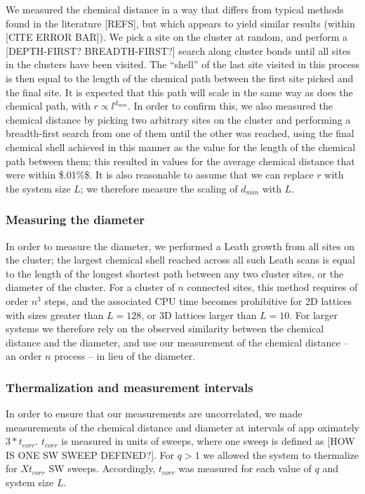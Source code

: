 \documentclass{article}
\begin{document}
We measured the chemical distance in a way that differs from typical methods found in the literature [REFS], but which appears to yield similar results (within [CITE ERROR BAR]).  We pick a site on the cluster at random, and perform a [DEPTH-FIRST? BREADTH-FIRST?] search along cluster bonds until all sites in the clusters have been visited.  The ``shell'' of the last site visited in this process is then equal to the length of the chemical path between the first site picked and the final site.  It is expected that this path will scale in the same way as does the chemical path, with $r \propto l^{d_{min}}$. In order to confirm this, we also measured the chemical distance by picking two arbitrary sites on the cluster and performing a breadth-first search from one of them until the other was reached, using the final chemical shell achieved in this manner as the value for the length of the chemical path between them; this resulted in values for the average chemical distance that were within \$.01\%\$. It is also reasonable to assume that we can replace $r$ with the system size $L$; we therefore measure the scaling of $d_{min}$ with $L$. 
\subsubsection{Measuring the diameter}
\label{sec-2.1.5}

In order to measure the diameter, we performed a Leath growth from all sites on the cluster; the largest chemical shell reached across all such Leath scans is equal to the length of the longest shortest path between any two cluster sites, or the diameter of the cluster.  For a cluster of $n$ connected sites, this method requires of order $n^3$ steps, and the associated CPU time becomes prohibitive for 2D lattices with sizes greater than $L=128$, or 3D lattices larger than $L=10$. For larger systems we therefore rely on the observed similarity between the chemical distance and the diameter, and use our measurement of the chemical distance -- an order $n$ process -- in lieu of the diameter.
\subsubsection{Thermalization and measurement intervals}
\label{sec-2.1.6}

In order to ensure that our measurements are uncorrelated, we made measurements of the chemical distance and diameter at intervals of app oximately $3*t_{corr}$. $t_{corr}$ is measured in units of sweeps, where one sweep is defined as [HOW IS ONE SW SWEEP DEFINED?]. For $q>1$ we allowed the system to thermalize for $X t_{corr}$ SW sweeps. Accordingly, $t_{corr}$ was measured for each
value of $q$ and system size $L$.  
\end{document}
